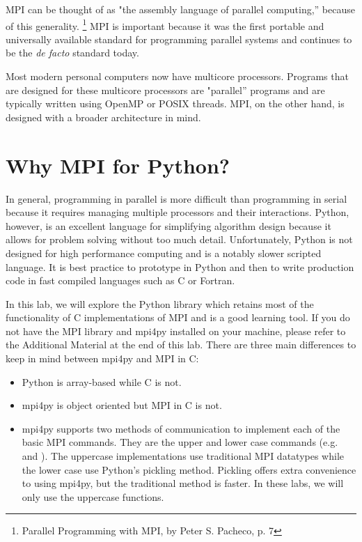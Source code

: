 MPI can be thought of as "the assembly language of parallel computing,'' because of this generality.
\footnote{Parallel Programming with MPI, by Peter S. Pacheco, p. 7}
MPI is important because it was the first portable and universally available standard for programming parallel systems and continues to be the \emph{de facto} standard today. 

\begin{info}
Most modern personal computers now have multicore processors. 
Programs that are designed for these multicore processors are "parallel'' programs and are typically written using OpenMP or POSIX threads.
MPI, on the other hand, is designed with a broader architecture in mind. 
\end{info}

\section*{Why MPI for Python?}
In general, programming in parallel is more difficult than programming in serial because it requires managing multiple processors and their interactions.
Python, however, is an excellent language for simplifying algorithm design because it allows for problem solving without too much detail.
Unfortunately, Python is not designed for high performance computing and is a notably slower scripted language.
It is best practice to prototype in Python and then to write production code in fast compiled languages such as C or Fortran.

In this lab, we will explore the Python library  which retains most of the functionality of C implementations of MPI and is a good learning tool. 
If you do not have the MPI library and mpi4py installed on your machine, please refer to the Additional Material at the end of this lab.
There are three main differences to keep in mind between mpi4py and MPI in C:
\begin{itemize}
    \item Python is array-based while C is not.
    \item mpi4py is object oriented but MPI in C is not.
    \item mpi4py supports two methods of communication to implement each of the basic MPI commands. 
    They are the upper and lower case commands (e.g.  and ). 
    The uppercase implementations use traditional MPI datatypes while the lower case use 
    Python's pickling method. Pickling offers extra convenience to using mpi4py, 
    but the traditional method is faster. In these labs, we will only use the uppercase functions.
\end{itemize}


